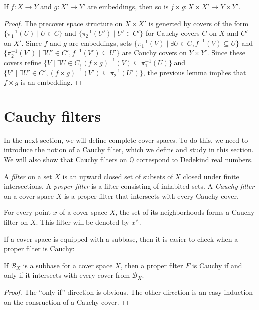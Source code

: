 \documentclass[reqno]{amsart}
\theoremstyle{definition}
\theoremstyle{remark}
\numberwithin{figure}{section}
\begin{document}
\begin{lem}
If $f : X \to Y$ and $g : X' \to Y'$ are embeddings, then so is $f \times g : X \times X' \to Y \times Y'$.
\end{lem}
\begin{proof}
The precover space structure on $X \times X'$ is generted by covers of the form $\{ \pi_1^{-1}(U) \mid U \in C \}$ and $\{ \pi_2^{-1}(U') \mid U' \in C' \}$ for Cauchy covers $C$ on $X$ and $C'$ on $X'$.
Since $f$ and $g$ are embeddings, sets $\{ \pi_1^{-1}(V) \mid \exists U \in C, f^{-1}(V) \subseteq U \}$ and $\{ \pi_2^{-1}(V') \mid \exists U' \in C', f^{-1}(V') \subseteq U' \}$ are Cauchy covers on $Y \times Y'$.
Since these covers refine $\{ V \mid \exists U \in C, (f \times g)^{-1}(V) \subseteq \pi_1^{-1}(U) \}$ and $\{ V' \mid \exists U' \in C', (f \times g)^{-1}(V') \subseteq \pi_2^{-1}(U') \}$, the previous lemma implies that $f \times g$ is an embedding.
\end{proof}

\section{Cauchy filters}
\label{sec:filters}

In the next section, we will define complete cover spaces.
To do this, we need to introduce the notion of a Cauchy filter, which we define and study in this section.
We will also show that Cauchy filters on $\mathbb{Q}$ correspond to Dedekind real numbers.

\begin{defn}
A \emph{filter} on a set $X$ is an upward closed set of subsets of $X$ closed under finite intersections.
A \emph{proper filter} is a filter consisting of inhabited sets.
A \emph{Cauchy filter} on a cover space $X$ is a proper filter that intersects with every Cauchy cover.
\end{defn}

\begin{example}
For every point $x$ of a cover space $X$, the set of its neighborhoods forms a Cauchy filter on $X$.
This filter will be denoted by $x^\wedge$.
\end{example}

If a cover space is equipped with a subbase, then it is easier to check when a proper filter is Cauchy:

\begin{prop}
If $\mathcal{B}_X$ is a subbase for a cover space $X$, then a proper filter $F$ is Cauchy if and only if it intersects with every cover from $\mathcal{B}_X$.
\end{prop}
\begin{proof}
The ``only if'' direction is obvious.
The other direction is an easy induction on the consruction of a Cauchy cover.
\end{proof}
\end{document}
